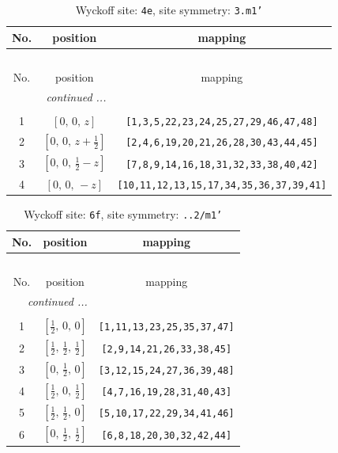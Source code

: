 \documentclass[fleqn,8pt]{jsarticle}
\begin{document}
\renewcommand{\arraystretch}{1.2}
\begin{longtable}{ccc}
\caption{Wyckoff site: {\tt 4e}, site symmetry: {\tt 3.m1'}}
 \\
 \hline \hline
No. & position & mapping \\ \hline \endfirsthead

\multicolumn{2}{l}{\tablename\ \thetable{}} \\
 \hline \hline
No. & position & mapping \\ \hline \endhead

 \hline \hline
\multicolumn{2}{r}{\footnotesize\it continued ...} \\ \endfoot

 \hline \hline
\multicolumn{2}{r}{} \\ \endlastfoot

1 & $\left[ 0,\, 0,\, z \right]$ & {\tt [1,3,5,22,23,24,25,27,29,46,47,48]} \\ \hline
2 & $\left[ 0,\, 0,\, z + \frac{1}{2} \right]$ & {\tt [2,4,6,19,20,21,26,28,30,43,44,45]} \\ \hline
3 & $\left[ 0,\, 0,\, \frac{1}{2} - z \right]$ & {\tt [7,8,9,14,16,18,31,32,33,38,40,42]} \\ \hline
4 & $\left[ 0,\, 0,\, - z \right]$ & {\tt [10,11,12,13,15,17,34,35,36,37,39,41]} \\
\end{longtable}
\renewcommand{\arraystretch}{1.2}
\begin{longtable}{ccc}
\caption{Wyckoff site: {\tt 6f}, site symmetry: {\tt ..2/m1'}}
 \\
 \hline \hline
No. & position & mapping \\ \hline \endfirsthead

\multicolumn{2}{l}{\tablename\ \thetable{}} \\
 \hline \hline
No. & position & mapping \\ \hline \endhead

 \hline \hline
\multicolumn{2}{r}{\footnotesize\it continued ...} \\ \endfoot

 \hline \hline
\multicolumn{2}{r}{} \\ \endlastfoot

1 & $\left[ \frac{1}{2},\, 0,\, 0 \right]$ & {\tt [1,11,13,23,25,35,37,47]} \\ \hline
2 & $\left[ \frac{1}{2},\, \frac{1}{2},\, \frac{1}{2} \right]$ & {\tt [2,9,14,21,26,33,38,45]} \\ \hline
3 & $\left[ 0,\, \frac{1}{2},\, 0 \right]$ & {\tt [3,12,15,24,27,36,39,48]} \\ \hline
4 & $\left[ \frac{1}{2},\, 0,\, \frac{1}{2} \right]$ & {\tt [4,7,16,19,28,31,40,43]} \\ \hline
5 & $\left[ \frac{1}{2},\, \frac{1}{2},\, 0 \right]$ & {\tt [5,10,17,22,29,34,41,46]} \\ \hline
6 & $\left[ 0,\, \frac{1}{2},\, \frac{1}{2} \right]$ & {\tt [6,8,18,20,30,32,42,44]} \\
\end{longtable}
\end{document}
